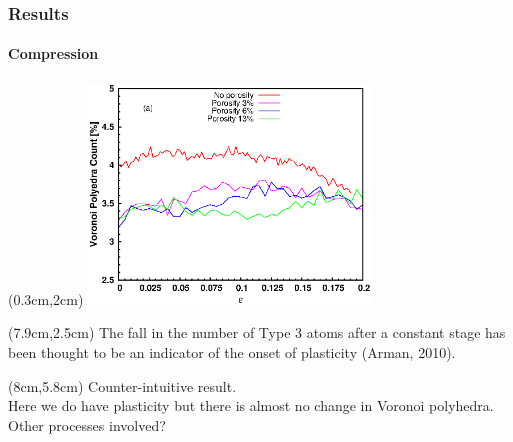 \documentclass[12pt,t]{beamer}
\begin{document}
\begin{frame}
    \frametitle{Results}
    \framesubtitle{Compression}
    \begin{textblock*}{7.5cm}(0.3cm,2cm) %
        \includegraphics[width=7.5cm]{Presentacion_PANACM_Franco/tipe3_strain_comp.eps}
    \end{textblock*}
    \begin{textblock*}{5cm}(7.9cm,2.5cm) %
        The fall in the number of Type 3 atoms after a constant stage has been thought to be an indicator of the onset of plasticity (Arman, 2010).
    \end{textblock*}
    \begin{textblock*}{5cm}(8cm,5.8cm) %
        Counter-intuitive result.\\
        Here we do have plasticity but there is almost no change in Voronoi polyhedra.\\
        Other processes involved?
    \end{textblock*}
\end{frame}

\end{document}
